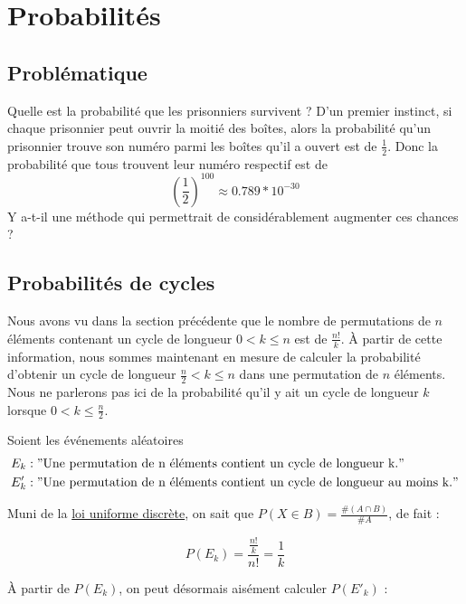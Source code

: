 \section{Probabilités}
\subsection{Problématique}

	Quelle est la probabilité que les prisonniers survivent ?
	D'un premier instinct, si chaque prisonnier peut ouvrir la moitié des boîtes, alors la probabilité qu'un prisonnier
	trouve son numéro parmi les boîtes qu'il a ouvert est de $\frac{1}{2}$. Donc la probabilité que tous trouvent leur
	numéro respectif est de $$\left(\frac{1}{2}\right)^{100} \approx 0.789 * 10^{-30}$$
	Y a-t-il une méthode qui permettrait de considérablement augmenter ces chances ?

\subsection{Probabilités de cycles}

	Nous avons vu dans la section précédente que le nombre de permutations de $n$ éléments contenant un cycle de longueur $0 < k \leq n$ est de $\frac{n!}{k}$.
	À partir de cette information, nous sommes maintenant en mesure de calculer la probabilité d'obtenir un cycle de longueur $\frac{n}{2} < k \leq n$ dans une permutation de $n$ éléments.
	Nous ne parlerons pas ici de la probabilité qu'il y ait un cycle de longueur $k$ lorsque $0 < k \leq \frac{n}{2}$.

	Soient les événements aléatoires
	\begin{align*}
		E_k  & : "\text{Une permutation de n éléments contient un cycle de longueur k.}"          \\
		E'_k & : "\text{Une permutation de n éléments contient un cycle de longueur au moins k.}"
	\end{align*}

	Muni de la \href{https://fr.wikipedia.org/wiki/Loi_uniforme_discr%C3%A8te#Calcul_d'une_probabilit%C3%A9}{loi uniforme discrète}, on sait que $P(X \in B) = \frac{\#(A \cap B)}{\#A}$, de fait :

	\begin{equation}
		P(E_k) = \frac{\frac{n!}{k}}{n!} = \frac{1}{k}
	\end{equation}

	À partir de $P(E_k)$, on peut désormais aisément calculer $P(E'_k)$ :

